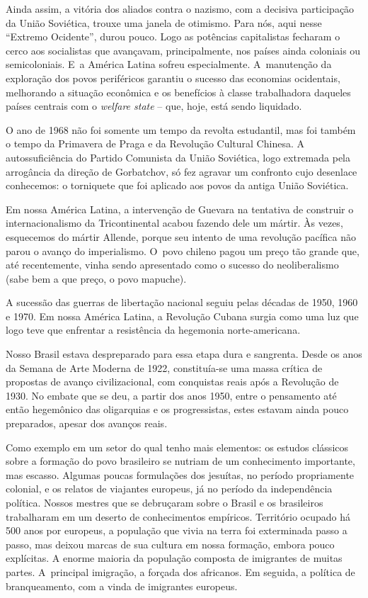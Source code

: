 {Ainda assim, a vitória dos aliados contra o nazismo, com a decisiva
participação da União Soviética, trouxe uma janela de otimismo. Para nós,
aqui nesse “Extremo Ocidente”, durou pouco. Logo as potências
capitalistas fecharam o cerco aos socialistas que avançavam,
principalmente, nos países ainda coloniais ou semicoloniais. E~a América
Latina sofreu especialmente. A~manutenção da exploração dos povos
periféricos garantiu o sucesso das economias ocidentais, melhorando a
situação econômica e os benefícios à classe trabalhadora daqueles países
centrais com o {\it welfare state} -- que, hoje, está sendo liquidado.

O ano de 1968 não foi somente um tempo da revolta estudantil, mas foi também o tempo
da Primavera de Praga e da Revolução Cultural Chinesa. A
autossuficiência do Partido Comunista da União Soviética, logo extremada
pela arrogância da direção de Gorbatchov, só fez agravar um confronto
cujo desenlace conhecemos: o torniquete que foi aplicado aos povos da
antiga União Soviética.

Em nossa América Latina, a intervenção de Guevara na tentativa de construir o
internacionalismo da Tricontinental acabou fazendo dele um mártir. Às
vezes, esquecemos do mártir Allende, porque seu intento de uma revolução
pacífica não parou o avanço do imperialismo. O~povo chileno pagou um
preço tão grande que, até recentemente, vinha sendo apresentado como o
sucesso do neoliberalismo (sabe bem a que preço, o povo mapuche).

A sucessão das guerras de libertação nacional seguiu pelas décadas de
1950, 1960 e 1970. Em nossa América Latina, a Revolução Cubana surgia como
uma luz que logo teve que enfrentar a resistência da hegemonia norte-americana.

Nosso Brasil estava despreparado para essa etapa dura e sangrenta. Desde
os anos da Semana de Arte Moderna de 1922, constituía-se uma massa crítica
de propostas de avanço civilizacional, com conquistas reais após a
Revolução de 1930. No embate que se deu, a partir dos anos 1950, entre o
pensamento até então hegemônico das oligarquias e os progressistas, estes
estavam ainda pouco preparados, apesar dos avanços reais.

Como exemplo em um setor do qual tenho mais elementos: os estudos
clássicos sobre a formação do povo brasileiro se nutriam de um
conhecimento importante, mas escasso. Algumas poucas formulações dos
jesuítas, no período propriamente colonial, e os relatos de viajantes europeus,
já no período da independência política. Nossos mestres que
se debruçaram sobre o Brasil e os brasileiros trabalharam em um deserto
de conhecimentos empíricos. Território ocupado há 500 anos por europeus,
a população que vivia na terra foi exterminada passo a passo, mas deixou
marcas de sua cultura em nossa formação, embora pouco explícitas. A
enorme maioria da população composta de imigrantes de muitas partes. A~principal
imigração, a forçada dos africanos. Em seguida, a política de branqueamento,
com a vinda de imigrantes europeus.

}
